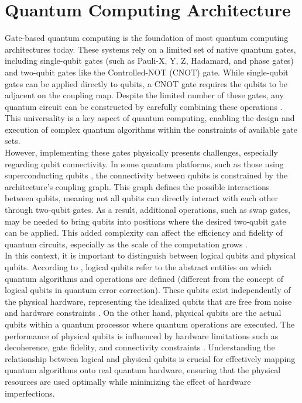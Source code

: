 \newpage
\section{Quantum Computing Architecture} %
Gate-based quantum computing is the foundation of most quantum computing architectures today. These systems rely on a limited set of native quantum gates, including single-qubit gates (such as Pauli-X, Y, Z, Hadamard, and phase gates) and two-qubit gates like the Controlled-NOT (CNOT) gate. While single-qubit gates can be applied directly to qubits, a CNOT gate requires the qubits to be adjacent on the coupling map. Despite the limited number of these gates, any quantum circuit can be constructed by carefully combining these operations \cite{barenco_elementary_1995}. This universality is a key aspect of quantum computing, enabling the design and execution of complex quantum algorithms within the constraints of available gate sets. \\
However, implementing these gates physically presents challenges, especially regarding qubit connectivity. In some quantum platforms, such as those using superconducting qubits \cite{krantz_quantum_2019}, the connectivity between qubits is constrained by the architecture's coupling graph. This graph defines the possible interactions between qubits, meaning not all qubits can directly interact with each other through two-qubit gates. As a result, additional operations, such as swap gates, may be needed to bring qubits into positions where the desired two-qubit gate can be applied. This added complexity can affect the efficiency and fidelity of quantum circuits, especially as the scale of the computation grows \cite{khandavilli_towards_2023}. \\
In this context, it is important to distinguish between logical qubits and physical qubits. According to \citeauthor{itoko_optimization_2020}, logical qubits refer to the abstract entities on which quantum algorithms and operations are defined (different from the concept of logical qubits in quantum error correction). These qubits exist independently of the physical hardware, representing the idealized qubits that are free from noise and hardware constraints \cite{itoko_optimization_2020}. On the other hand, physical qubits are the actual qubits within a quantum processor where quantum operations are executed. The performance of physical qubits is influenced by hardware limitations such as decoherence, gate fidelity, and connectivity constraints \cite{bandic_interaction_2023}. Understanding the relationship between logical and physical qubits is crucial for effectively mapping quantum algorithms onto real quantum hardware, ensuring that the physical resources are used optimally while minimizing the effect of hardware imperfections. \\
